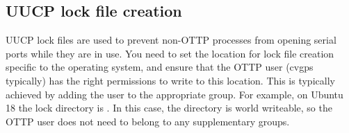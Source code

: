\subsection{UUCP lock file creation}

UUCP lock files are used to prevent non-OTTP processes from opening serial ports while they are 
in use. You need to set the location for lock file creation specific to the operating system, 
and ensure that the OTTP user (cvgps typically) has the right permissions to write to this location. 
This is typically achieved by adding the user to the appropriate group. 
For example, on Ubuntu 18 the lock directory is . 
In this case, the directory is world writeable, so 
the OTTP user does not need to belong to any supplementary groups.

